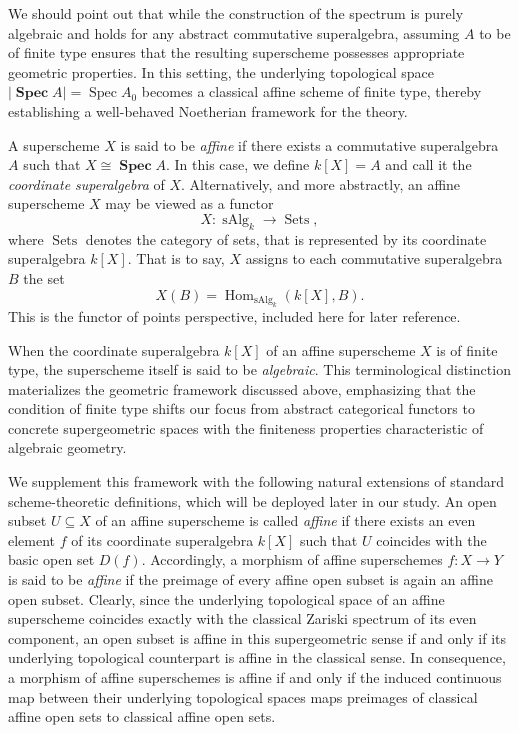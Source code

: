 \documentclass[11pt,a4paper,reqno,noamsfonts]{amsart}
\numberwithin{equation}{section}
\theoremstyle{definition}
\theoremstyle{remark}
\DeclareMathOperator{\Hom}{Hom}
\DeclareMathOperator{\Spec}{Spec}
\DeclareMathOperator{\sSpec}{\mathbf{Spec}}
\DeclareMathOperator{\Sets}{Sets}
\DeclareMathOperator{\sAlg}{sAlg}
\begin{document}
We should point out that while the construction of the spectrum is purely algebraic and holds for any abstract commutative superalgebra, assuming $A$ to be of finite type ensures that the resulting superscheme possesses appropriate geometric properties. In this setting, the underlying topological space $\lvert \sSpec A \rvert = \Spec A_0$ becomes a classical affine scheme of finite type, thereby establishing a well-behaved Noetherian framework for the theory.

A superscheme $X$ is said to be \emph{affine} if there exists a commutative superalgebra $A$ such that $X\cong\sSpec A$. In this case, we define $k[X] = A$ and call it the \emph{coordinate superalgebra} of $X$. Alternatively, and more abstractly, an affine superscheme $X$ may be viewed as a functor
\begin{equation}
   X \colon \sAlg_k \longrightarrow \Sets,
\end{equation}
where $\Sets$ denotes the category of sets, that is represented by its coordinate superalgebra $k[X]$. That is to say, $X$ assigns to each commutative superalgebra $B$ the set
\begin{equation}
X(B) = \Hom_{\sAlg_k}(k[X], B).
\end{equation}
 This is the functor of points perspective, included here for later reference.
 
When the coordinate superalgebra $k[X]$ of an affine superscheme $X$ is of finite type, the superscheme itself is said to be \emph{algebraic}. This terminological distinction materializes the geometric framework discussed above, emphasizing that the condition of finite type shifts our focus from abstract categorical functors to concrete supergeometric spaces with the finiteness properties characteristic of algebraic geometry.

We supplement this framework with the following natural extensions of standard scheme-theoretic definitions, which will be deployed later in our study. An open subset $U \subseteq X$ of an affine superscheme is called \emph{affine} if there exists an even element $f$ of its coordinate superalgebra  $k[X]$ such that $U$ coincides with the basic open set $D(f)$. Accordingly, a morphism of affine superschemes $f \colon X \to Y$ is said to be \emph{affine} if the preimage of every affine open subset is again an affine open subset. Clearly, since the underlying topological space of an affine superscheme coincides exactly with the classical Zariski spectrum of its even component, an open subset is affine in this supergeometric sense if and only if its underlying topological counterpart is affine in the classical sense. In consequence, a morphism of affine superschemes is affine if and only if the induced continuous map between their underlying topological spaces maps preimages of classical affine open sets to classical affine open sets.
\end{document}

